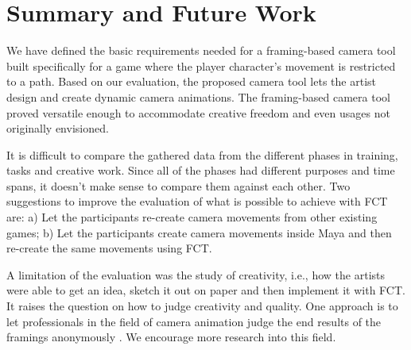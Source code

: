 \section{Summary and Future Work}
We have defined the basic requirements needed for a framing-based camera tool built specifically for a game where the player character's movement is restricted to a path. Based on our evaluation, the proposed camera tool lets the artist design and create dynamic camera animations. The framing-based camera tool proved versatile enough to accommodate creative freedom and even usages not originally envisioned. 

It is difficult to compare the gathered data from the different phases in training, tasks and creative work. Since all of the phases had different purposes and time spans, it doesn't make sense to compare them against each other. Two suggestions to improve the evaluation of what is possible to achieve with FCT are: a) Let the participants re-create camera movements from other existing games; b) Let the participants create camera movements inside Maya and then re-create the same movements using FCT.

A limitation of the evaluation was the study of creativity, i.e., how the artists were able to get an idea, sketch it out on paper and then implement it with FCT. It raises the question on how to judge creativity and quality. One approach is to let professionals in the field of camera animation judge the end results of the framings anonymously \cite{sadeghi_artist_2010}. We encourage more research into this field.